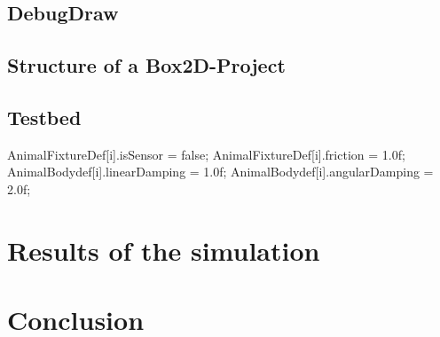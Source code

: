 \documentclass[10pt,a4paper,DIV=11]{scrreprt}
\begin{document}
\section{DebugDraw}


\section{Structure of a Box2D-Project}




\section{Testbed}


    AnimalFixtureDef[i].isSensor = false;
    AnimalFixtureDef[i].friction = 1.0f;
    AnimalBodydef[i].linearDamping = 1.0f;
    AnimalBodydef[i].angularDamping = 2.0f;


\chapter{Results of the simulation}

\chapter{Conclusion}





\newpage


\listoffigures
\listoftables
\listofalgorithms
\lstlistoflistings

\newpage











\end{document}
